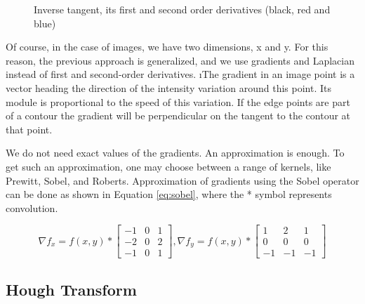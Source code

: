 \begin{figure}[ht]
    \centering
    \caption{Inverse tangent, its first and second order derivatives (black, red and blue)}
    \label{fig:inverse_tangent}
\end{figure}

Of course, in the case of images, we have two dimensions, x and y. For this reason, the previous approach is generalized, and we use gradients and Laplacian instead of first and second-order derivatives. \i{The gradient in an image point is a vector heading the direction of the intensity variation around this point. Its module is proportional to the speed of this variation. If the edge points are part of a contour the gradient will be perpendicular on the tangent to the contour at that point}\cite{ip_labs}.

We do not need exact values of the gradients. An approximation is enough. To get such an approximation, one may choose between a range of kernels, like Prewitt, Sobel, and Roberts. Approximation of gradients using the Sobel operator can be done as shown in Equation \ref{eq:sobel}, where the * symbol represents convolution.

\begin{equation} \label{eq:sobel}
\nabla f_x = f(x,y) * 
\begin{bmatrix}
    -1 &  0 &  1 \\
    -2 &  0 &  2 \\
    -1 &  0 &  1 
\end{bmatrix}
,
\nabla f_y = f(x,y) * 
\begin{bmatrix}
     1 &  2 &  1 \\
     0 &  0 &  0 \\
    -1 & -1 & -1
\end{bmatrix}
\end{equation}



\subsection{Hough Transform} \label{analysis:hough-transform}

